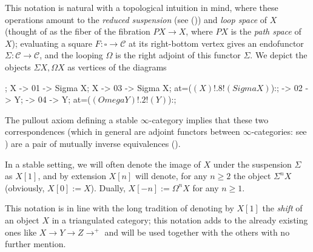 \documentclass[11pt, a4paper]{amsart}
\newcommand{\pullback}[2]{\obj at=($(#1)!.2!(#2)$):{\lrcorner}}
\newcommand{\pushout}[2]{\obj  at=($(#1)!.8!(#2)$):{\ulcorner}}
\renewcommand{\C}{\mathcal{C}}
\begin{document}
This notation is natural with a topological intuition in mind, where these operations amount to the \emph{reduced suspension} (see ()) and \emph{loop space} of $X$ (thought of as the fiber of the fibration $PX \to X$, where $PX$ is the \emph{path space} of $X$); evaluating a square $F\colon \square\to \C$ at its right-bottom vertex gives an endofunctor $\Sigma\colon \C\to \C$, and the looping $\Omega$ is the right adjoint of this functor $\Sigma$. We depict the objects $\Sigma X, \Omega X$ as vertices of the diagrams

\begin{center}
\begin{kD}
;
\mor X -> 01 -> {Sigma X};
\mor X -> 03 -> {Sigma X};
\pushout{X}{Sigma X};
 -> 02 -> Y;
 -> 04 -> Y;
\pullback{Omega Y}{Y};
\end{kD}
\end{center}
The pullout axiom defining a stable $\infty$-category implies that these two correspondences (which in general are adjoint functors between $\infty$-categories: see \cite[Remark \textbf{1.1.2.8}]{LurieHA}) are a pair of mutually inverse equivalences (\cite[Prop. \textbf{5.8}]{Gro}).
\begin{notat}\label{shifteggio}
In a stable setting, we will often denote the image of $X$ under the suspension $\Sigma$ as $X[1]$, and by extension $X[n]$ will denote, for any $n\ge 2$ the object $\Sigma^nX$ (obviously, $X[0]:=X$). Dually, $X[-n]:=\Omega^n X$ for any $n\ge 1$.
\end{notat}
This notation is in line with the long tradition of denoting by $X[1]$ the \emph{shift} of an object $X$ in a triangulated category; this notation adds to the already existing ones like $X\to Y\to Z\to^+$ and will be used together with the others with no further mention. 
\end{document}
